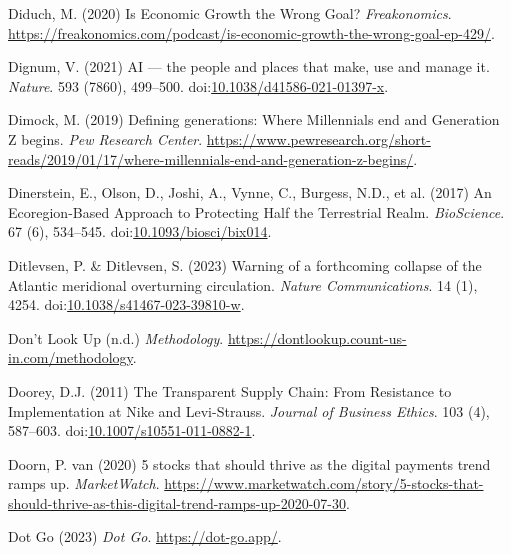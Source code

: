 \documentclass[
  letterpaper,
  DIV=11,
  numbers=noendperiod]{scrartcl}
\newlength{\cslhangindent}
\newenvironment{CSLReferences}[2] %
 {\begin{list}{}{%
  \setlength{\itemindent}{0pt}
  \setlength{\leftmargin}{0pt}
  \setlength{\parsep}{0pt}
  \ifodd #1
   \setlength{\leftmargin}{\cslhangindent}
   \setlength{\itemindent}{-1\cslhangindent}
  \fi
  \setlength{\itemsep}{#2\baselineskip}}}
 {\end{list}}
\begin{document}
\begin{CSLReferences}{0}{1}
Diduch, M. (2020) Is {Economic Growth} the {Wrong Goal}?
\emph{Freakonomics}.
\url{https://freakonomics.com/podcast/is-economic-growth-the-wrong-goal-ep-429/}.

Dignum, V. (2021) {AI} --- the people and places that make, use and
manage it. \emph{Nature}. 593 (7860), 499--500.
doi:\href{https://doi.org/10.1038/d41586-021-01397-x}{10.1038/d41586-021-01397-x}.

Dimock, M. (2019) Defining generations: {Where Millennials} end and
{Generation Z} begins. \emph{Pew Research Center}.
\url{https://www.pewresearch.org/short-reads/2019/01/17/where-millennials-end-and-generation-z-begins/}.

Dinerstein, E., Olson, D., Joshi, A., Vynne, C., Burgess, N.D., et al.
(2017) An {Ecoregion-Based Approach} to {Protecting Half} the
{Terrestrial Realm}. \emph{BioScience}. 67 (6), 534--545.
doi:\href{https://doi.org/10.1093/biosci/bix014}{10.1093/biosci/bix014}.

Ditlevsen, P. \& Ditlevsen, S. (2023) Warning of a forthcoming collapse
of the {Atlantic} meridional overturning circulation. \emph{Nature
Communications}. 14 (1), 4254.
doi:\href{https://doi.org/10.1038/s41467-023-39810-w}{10.1038/s41467-023-39810-w}.

Don't Look Up (n.d.) \emph{Methodology}.
\url{https://dontlookup.count-us-in.com/methodology}.

Doorey, D.J. (2011) The {Transparent Supply Chain}: From {Resistance} to
{Implementation} at {Nike} and {Levi-Strauss}. \emph{Journal of Business
Ethics}. 103 (4), 587--603.
doi:\href{https://doi.org/10.1007/s10551-011-0882-1}{10.1007/s10551-011-0882-1}.

Doorn, P. van (2020) 5 stocks that should thrive as the digital payments
trend ramps up. \emph{MarketWatch}.
\url{https://www.marketwatch.com/story/5-stocks-that-should-thrive-as-this-digital-trend-ramps-up-2020-07-30}.

Dot Go (2023) \emph{Dot {Go}}. \url{https://dot-go.app/}.


\end{CSLReferences}
\end{document}

